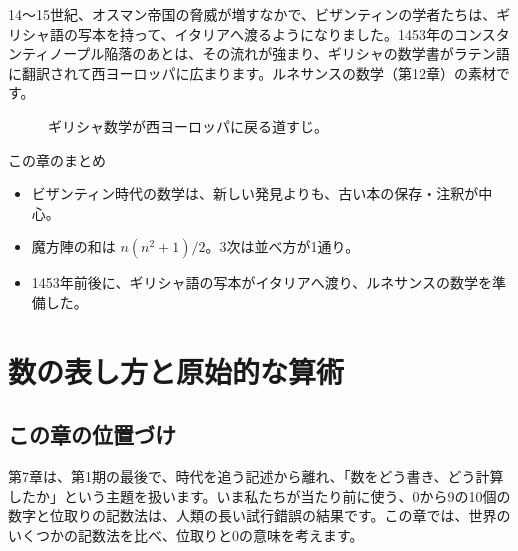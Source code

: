 \documentclass[a4paper,11pt,openany]{ltjsbook}
\begin{document}
14〜15世紀、オスマン帝国の脅威が増すなかで、ビザンティンの学者たちは、ギリシャ語の写本を持って、イタリアへ渡るようになりました。1453年のコンスタンティノープル陥落のあとは、その流れが強まり、ギリシャの数学書がラテン語に翻訳されて西ヨーロッパに広まります。ルネサンスの数学（第12章）の素材です。

\begin{figure}[htbp]
\centering
{}
\caption{ギリシャ数学が西ヨーロッパに戻る道すじ。}
\end{figure}

\begin{pointbox}{この章のまとめ}
\begin{itemize}[leftmargin=*]
\item ビザンティン時代の数学は、新しい発見よりも、古い本の保存・注釈が中心。
\item 魔方陣の和は $n(n^2+1)/2$。3次は並べ方が1通り。
\item 1453年前後に、ギリシャ語の写本がイタリアへ渡り、ルネサンスの数学を準備した。
\end{itemize}
\end{pointbox}

\chapter{数の表し方と原始的な算術}

\section{この章の位置づけ}

第7章は、第1期の最後で、時代を追う記述から離れ、「数をどう書き、どう計算したか」という主題を扱います。いま私たちが当たり前に使う、0から9の10個の数字と位取りの記数法は、人類の長い試行錯誤の結果です。この章では、世界のいくつかの記数法を比べ、位取りと0の意味を考えます。
\end{document}
